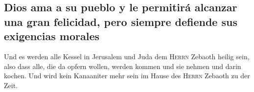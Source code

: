 \hypertarget{dios-ama-a-su-pueblo-y-le-permitiruxe1-alcanzar-una-gran-felicidad-pero-siempre-defiende-sus-exigencias-morales}{%
\subsection{Dios ama a su pueblo y le permitirá alcanzar una gran
felicidad, pero siempre defiende sus exigencias
morales}\label{dios-ama-a-su-pueblo-y-le-permitiruxe1-alcanzar-una-gran-felicidad-pero-siempre-defiende-sus-exigencias-morales}}

 Und es werden alle Kessel in Jerusalem und Juda dem
\textsc{Herrn} Zebaoth heilig sein, also dass alle, die da opfern
wollen, werden kommen und sie nehmen und darin kochen. Und wird kein
Kanaaniter mehr sein im Hause des \textsc{Herrn} Zebaoth zu der Zeit.
